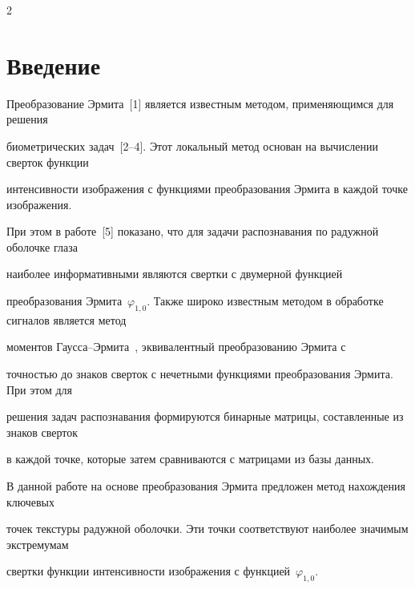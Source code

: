       \begin{multicols}{2}





      \label{st\stat}


      


  





\section{Введение}





Преобразование Эрмита~[1] является известным методом, применяющимся для решения 


биометрических задач~[2--4]. Этот локальный метод основан на вычислении сверток функции 


интенсивности изображения с функциями преобразования Эрмита в каждой точке изображения. 


При этом в работе~[5] показано, что для задачи распознавания по радужной оболочке глаза 


наиболее информативными являются свертки с двумерной функцией 


пре\-об\-разо\-ва\-ния Эрмита~$\varphi_{1,0}$. Также широко известным методом в обработке сигналов является метод 


моментов Гаусса--Эрмита~\cite{2pav}, эквивалентный преобразованию Эрмита с 


точностью до знаков сверток с нечетными функциями преобразования Эрмита. При этом для 


решения задач распознавания формируются бинарные матрицы, составленные из знаков сверток 


в каждой точке, которые затем сравниваются с матрицами из базы данных.


{ %





}





В данной работе на основе преобразования Эрмита предложен метод нахождения ключевых 


точек текстуры радужной оболочки. Эти точки соответствуют наиболее значимым экстремумам 


свертки функции интенсивности изображения с функцией~$\varphi_{1,0}$. 






\end{multicols}
